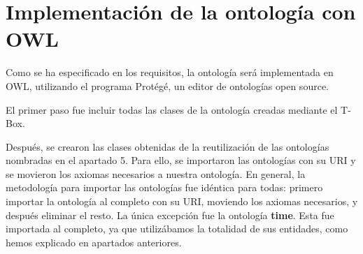 \documentclass[a4paper,12pt]{article}
\begin{document}
	\section{Implementación de la ontología con OWL}
	
	Como se ha especificado en los requisitos, la ontología será implementada en OWL, utilizando el programa Protégé, un editor de ontologías open source.
	
	El primer paso fue incluir todas las clases de la ontología creadas mediante el T-Box.
	
	Después, se crearon las clases obtenidas de la reutilización de las ontologías nombradas en el apartado 5. Para ello, se importaron las ontologías con su URI y se movieron los axiomas necesarios a nuestra ontología. En general, la metodología para importar las ontologías fue idéntica para todas: primero importar la ontología al completo con su URI, moviendo los axiomas necesarios, y después eliminar el resto. La única excepción fue la ontología \textbf{time}. Esta fue importada al completo, ya que utilizábamos la totalidad de sus entidades, como hemos explicado en apartados anteriores. 
	
\end{document}
